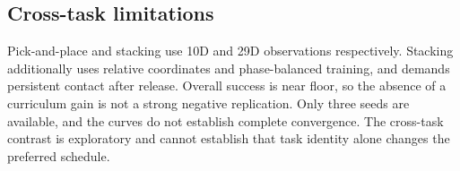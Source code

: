 \subsection{Cross-task limitations}
Pick-and-place and stacking use 10D and 29D observations respectively.
Stacking additionally uses relative coordinates and phase-balanced training,
and demands persistent contact after release. Overall success is near floor,
so the absence of a curriculum gain is not a strong negative replication.
Only three seeds are available, and the curves do not establish complete
convergence. The cross-task contrast is exploratory and cannot establish that
task identity alone changes the preferred schedule.

\newpage
